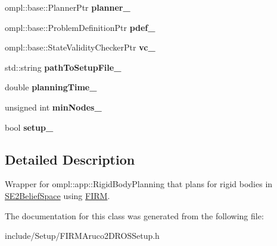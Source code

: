 \begin{DoxyCompactItemize}
\item 
\hypertarget{class_f_i_r_m_aruco2_d_r_o_s_setup_a07b3fc5b516305a7555876b8fe34bce7}{ompl\-::base\-::\-Planner\-Ptr {\bfseries planner\-\_\-}}\label{class_f_i_r_m_aruco2_d_r_o_s_setup_a07b3fc5b516305a7555876b8fe34bce7}

\item 
\hypertarget{class_f_i_r_m_aruco2_d_r_o_s_setup_a1f9625d517a8f370ac0c532bb5dc2751}{ompl\-::base\-::\-Problem\-Definition\-Ptr {\bfseries pdef\-\_\-}}\label{class_f_i_r_m_aruco2_d_r_o_s_setup_a1f9625d517a8f370ac0c532bb5dc2751}

\item 
\hypertarget{class_f_i_r_m_aruco2_d_r_o_s_setup_ab1e92e95e20ed11bd1cca15a0b0590c6}{ompl\-::base\-::\-State\-Validity\-Checker\-Ptr {\bfseries vc\-\_\-}}\label{class_f_i_r_m_aruco2_d_r_o_s_setup_ab1e92e95e20ed11bd1cca15a0b0590c6}

\item 
\hypertarget{class_f_i_r_m_aruco2_d_r_o_s_setup_aba4edbbdb8129a2563749064cf4d1111}{std\-::string {\bfseries path\-To\-Setup\-File\-\_\-}}\label{class_f_i_r_m_aruco2_d_r_o_s_setup_aba4edbbdb8129a2563749064cf4d1111}

\item 
\hypertarget{class_f_i_r_m_aruco2_d_r_o_s_setup_a4f56a34657c037f6fb1a2847b0c1597d}{double {\bfseries planning\-Time\-\_\-}}\label{class_f_i_r_m_aruco2_d_r_o_s_setup_a4f56a34657c037f6fb1a2847b0c1597d}

\item 
\hypertarget{class_f_i_r_m_aruco2_d_r_o_s_setup_a00672b623cb82f20376cedbbd0f5bb92}{unsigned int {\bfseries min\-Nodes\-\_\-}}\label{class_f_i_r_m_aruco2_d_r_o_s_setup_a00672b623cb82f20376cedbbd0f5bb92}

\item 
\hypertarget{class_f_i_r_m_aruco2_d_r_o_s_setup_a7e5f55d1f8e440de504cef46d5ec4888}{bool {\bfseries setup\-\_\-}}\label{class_f_i_r_m_aruco2_d_r_o_s_setup_a7e5f55d1f8e440de504cef46d5ec4888}

\end{DoxyCompactItemize}


\subsection{Detailed Description}
Wrapper for ompl\-::app\-::\-Rigid\-Body\-Planning that plans for rigid bodies in \hyperlink{class_s_e2_belief_space}{S\-E2\-Belief\-Space} using \hyperlink{class_f_i_r_m}{F\-I\-R\-M}. 

The documentation for this class was generated from the following file\-:\begin{DoxyCompactItemize}
\item 
include/\-Setup/F\-I\-R\-M\-Aruco2\-D\-R\-O\-S\-Setup.\-h\end{DoxyCompactItemize}

